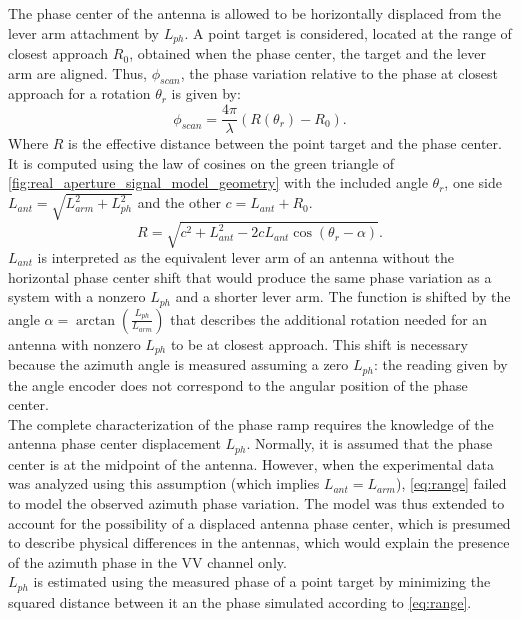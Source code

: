 The phase center of the antenna is allowed to be horizontally displaced from the lever arm attachment by $L_{ph}$.
A point target is considered, located at the  range of closest approach $R_{0}$, obtained when the phase center, the target and the lever arm are aligned. Thus, $\phi_{scan}$, the phase variation relative to the phase at closest approach for a rotation  $\theta_r$  is given by:
\begin{equation}\label{eq:range_phase}
	\phi_{scan} = \frac{4 \pi}{\lambda}\left(R\left(\theta_r\right) - R_0\right) .
\end{equation}
Where $R$ is the effective distance between the point target and the phase center.
It is computed using the law of cosines on the green triangle of \autoref{fig:real_aperture_signal_model_geometry} with the included angle $\theta_r$, one  side $L_{ant} = \sqrt{L_{arm}^2 + L_{ph}^2}$ and the other $c = L_{ant} + R_0$.
\begin{equation}\label{eq:range}
	R = \sqrt{ c^2 +  L_{ant}^2 - 2 c L_{ant} \cos{\left(\theta_r - \alpha\right)}}.
\end{equation}
$L_{ant}$ is interpreted as the equivalent lever arm of an antenna without the horizontal phase center shift that would produce the same phase variation as a system with a nonzero $L_{ph}$ and a shorter lever arm.
The function is shifted by the angle  $\alpha = \operatorname{\arctan}\left({\frac{L_{ph}}{L_{arm}}}\right)$ that describes the additional rotation needed for an antenna with nonzero $L_{ph}$ to be at closest approach. This shift is necessary because the azimuth angle is measured assuming a zero $L_{ph}$: the reading given by the angle encoder does not correspond to the angular position of the phase center.\\
The complete characterization of the phase ramp requires the knowledge of the antenna phase center displacement $L_{ph}$. Normally, it is assumed that the phase center is at the midpoint of the antenna. However, when the experimental data was analyzed using this assumption (which implies $L_{ant} = L_{arm}$),  \autoref{eq:range} failed to model the observed azimuth phase variation. The model was thus extended to account for the possibility of a displaced antenna phase center, which is presumed to describe physical differences in the antennas, which would explain the presence of the azimuth phase in the VV channel only.\\ $L_{ph}$ is estimated using the measured phase of a point target by minimizing the squared distance between it an the phase simulated according to \autoref{eq:range}.
